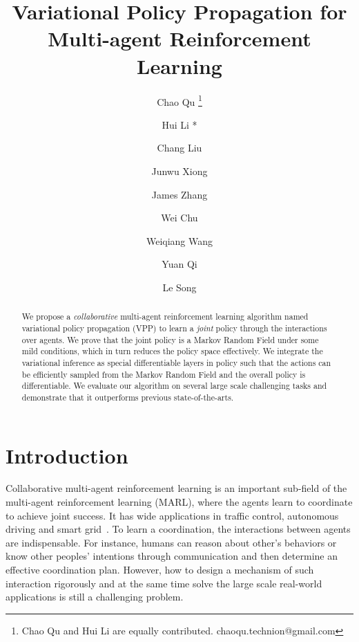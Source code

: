 \documentclass[11pt,a4paper]{article}
\title{ Variational Policy Propagation for Multi-agent Reinforcement Learning  }
\date{}
\author[1]{Chao Qu \footnote{Chao Qu and Hui Li are equally contributed. chaoqu.technion@gmail.com}}
\author[1]{Hui Li *}
\author[2]{Chang Liu}
\author[1]{Junwu Xiong}
\author[1]{James Zhang}
\author[1]{Wei Chu}
\author[1]{Weiqiang Wang}
\author[1]{Yuan Qi}
\author[1,3]{Le Song}
\affil[1]{Ant Financial Services Group}
\affil[2]{Shanghai Jiao Tong University}
\affil[3]{College of Computing, Georgia Institute of Technology}
\theoremstyle{definition}
\begin{document}
\maketitle



\begin{abstract}
We propose a \emph{collaborative} multi-agent reinforcement learning algorithm named variational policy propagation (VPP) to learn a \emph{joint} policy through the interactions over agents.  We prove that the joint policy is a Markov Random Field  under some mild conditions, which in turn reduces the policy space effectively. We integrate the variational inference  as special differentiable layers in policy such that the actions can be efficiently sampled from the Markov Random Field and the overall policy is differentiable. We evaluate our algorithm on several large scale challenging tasks and demonstrate that it outperforms previous state-of-the-arts.
\end{abstract}


\section{Introduction}
Collaborative multi-agent reinforcement learning is an important sub-field of the multi-agent reinforcement learning (MARL), where the agents learn to coordinate to achieve joint success. It has wide applications in traffic control, autonomous driving  and smart grid~\citep{kuyer2008multiagent,shalev2016safe}. To learn a coordination, the interactions between agents are indispensable. For instance,  humans can reason about other's behaviors or know other peoples' intentions through communication and then determine an effective coordination plan. However, how to design a mechanism of such interaction rigorously  and at the same time solve the large scale real-world applications is still a challenging problem.
\end{document}
